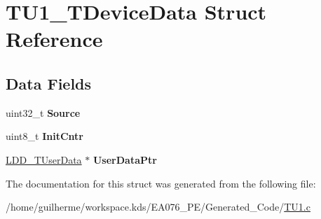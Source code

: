 \hypertarget{struct_t_u1___t_device_data}{}\section{T\+U1\+\_\+\+T\+Device\+Data Struct Reference}
\label{struct_t_u1___t_device_data}
\subsection*{Data Fields}
\begin{DoxyCompactItemize}
\item 
\mbox{\label{struct_t_u1___t_device_data_a8508ed57529bed0eb9ece19e90d8dd9f}} 
uint32\+\_\+t {\bfseries Source}
\item 
\mbox{\label{struct_t_u1___t_device_data_a6f7812497a6a66d8ce0baace72a4a0c6}} 
uint8\+\_\+t {\bfseries Init\+Cntr}
\item 
\mbox{\label{struct_t_u1___t_device_data_a3998052c6674b750711c4ce24df0a417}} 
\hyperlink{group___p_e___types__module_ga0b66a73f87238a782318aa0be7578e35}{L\+D\+D\+\_\+\+T\+User\+Data} $\ast$ {\bfseries User\+Data\+Ptr}
\end{DoxyCompactItemize}


The documentation for this struct was generated from the following file\+:\begin{DoxyCompactItemize}
\item 
/home/guilherme/workspace.\+kds/\+E\+A076\+\_\+\+P\+E/\+Generated\+\_\+\+Code/\hyperlink{_t_u1_8c}{T\+U1.\+c}\end{DoxyCompactItemize}
